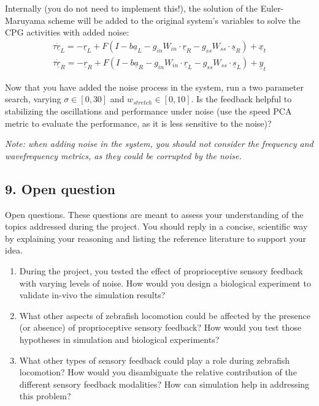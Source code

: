 \documentclass{cmc}
\begin{document}
Internally (you do not need to implement this!), the solution of the Euler-Maruyama scheme will be added to the original system's variables to solve the CPG activities with added noise:
\begin{equation}
    \begin{array}{lcl}
	\tau \dot{\underline{r}}_{L} = -\underline{r}_L + F(I-b \underline{a}_L - g_{in} W_{in} \cdot \underline{r}_R - g_{ss} W_{ss} \cdot \underline{s}_R ) + \underline{x}_t\\
	\tau \dot{\underline{r}}_{R} = -\underline{r}_R + F(I-b \underline{a}_R - g_{in} W_{in} \cdot \underline{r}_L - g_{ss} W_{ss} \cdot \underline{s}_L ) + \underline{y}_t
    \end{array}
	\label{eq:noise_added_vectorial}
\end{equation}

Now that you have added the noise process in the system, run a two parameter search, varying $\sigma \in \left[0, 30\right]$ and $w_{stretch} \in \left[0, 10\right]$. Is the feedback helpful to stabilizing the oscillations and performance under noise (use the speed PCA metric to evaluate the performance, as it is less sensitive to the noise)?

\textit{Note: when adding noise in the system, you should not consider the frequency and wavefrequency metrics, as they could be corrupted by the noise.}




\subsection*{9. Open question}\label{sec:ex9}
Open questions. These questions are meant to assess your understanding of the topics addressed during the project. You should reply in a concise, scientific way by explaining your reasoning and listing the reference literature to support your idea.

\begin{enumerate}
\item During the project, you tested the effect of proprioceptive sensory feedback with varying levels of noise. How would you design a biological experiment to validate in-vivo the simulation results?
\item What other aspects of zebrafish locomotion could be affected by the presence (or absence) of proprioceptive sensory feedback? How would you test those hypotheses in simulation and biological experiments?
\item What other types of sensory feedback could play a role during zebrafish locomotion? How would you disambiguate the relative contribution of the different sensory feedback modalities? How can simulation help in addressing this problem?
\end{enumerate}







\label{sec:references}






\end{document}
